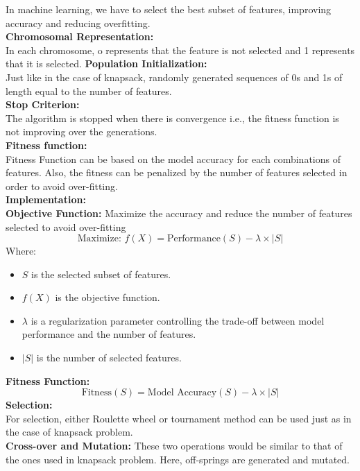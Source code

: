 \documentclass{article}
\begin{document}
{{{{In machine learning, we have to select the best subset of features, improving accuracy and reducing overfitting.\\
\textbf{Chromosomal Representation:}\\
In each chromosome, o represents that the feature is not selected and 1 represents that it is selected.
\textbf{Population Initialization:}\\
Just like in the case of knapsack, randomly generated sequences of 0s and 1s of length equal to the number of features. \\
\textbf{Stop Criterion: }\\
The algorithm is stopped when there is convergence i.e., the fitness function is not improving over the generations.\\
\textbf{Fitness function: }\\
Fitness Function can be based on the model accuracy for each combinations of features. Also, the fitness can be penalized by the number of features selected in order to avoid over-fitting.\\
\textbf{Implementation: }\\
\textbf{Objective Function: }
Maximize the accuracy and reduce the number of features selected to avoid over-fitting \\
\begin{equation}
\text{Maximize: } f(X) = \text{Performance}(S) - \lambda \times |S|
\end{equation}
Where:
\begin{itemize}
    \item \( S \) is the selected subset of features.
    \item \( f(X) \) is the objective function.
    \item \( \lambda \) is a regularization parameter controlling the trade-off between model performance and the number of features.
    \item \( |S| \) is the number of selected features.
\end{itemize}
\textbf{Fitness Function: }\\
\[
\text{Fitness}(S) = \text{Model Accuracy}(S) - \lambda \times |S|
\]
\textbf{Selection: }\\
For selection, either Roulette wheel or tournament method can be used just as in the case of knapsack problem.\\
\textbf{Cross-over and Mutation: }
These two operations would be similar to that of the ones used in knapsack problem. Here, off-springs are generated and mutated.

}}}}
\end{document}
